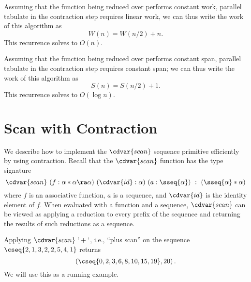 \begin{gram}
Assuming that the function being reduced over performs constant work, 
parallel tabulate in the contraction step requires linear work, 
we can thus write the work of this algorithm as 
\[
W(n) = W(n/2) + n.
\]
This recurrence solves to $O(n)$.
%


Assuming that the function being reduced over performs constant span, 
parallel tabulate in the contraction step requires constant span;
we can thus write the work of this algorithm as
%
\[
S(n) = S(n/2) + 1.
\]
This recurrence solves to $O(\log{n})$.
\end{gram}

\section{Scan with Contraction}
\label{sec:design::contraction::scan}

\begin{gram}
We describe how to implement the $\cdvar{scan}$ sequence primitive
efficiently by using contraction.
%
Recall that 
the $\cdvar{scan}$ function has the type signature
\[
\cdvar{scan}~(f: \alpha * \alpha \ra \alpha)~(\cdvar{id}: \alpha)~(a: \sseq{\alpha})~:~(\sseq{\alpha} * \alpha)
\]
where $f$ is an associative function, $a$ is a sequence, and
$\cdvar{id}$ is the identity element of $f$.
%
When evaluated with a function and a sequence, $\cdvar{scan}$ can be
viewed as applying a reduction to every prefix of the sequence and
returning the results of such reductions as a sequence.
%
\end{gram}

\begin{example}
Applying $\cdvar{scan}~`+`$, i.e., ``plus scan'' on the sequence
$\cseq{2,1,3,2,2,5,4,1}$ returns
\[
\left(\cseq{0, 2, 3, 6, 8, 10, 15, 19}, 20\right).
\]
We will use this as a running example.
\end{example}

